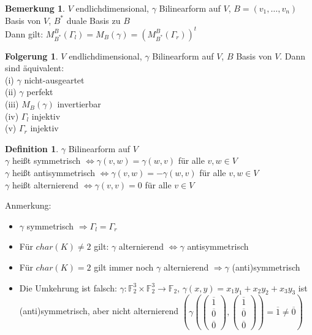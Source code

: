 \documentclass[10pt,a4paper,numbers=endperiod]{scrartcl}
\theoremstyle{definition}
\newtheorem{defi}[satz]{Definition}
\newtheorem{bem}[satz]{Bemerkung}
\newtheorem{folg}[satz]{Folgerung}
\def\FF{{\mathbb F}}
\begin{document}
\begin{bem}
	$V$ endlichdimensional, $\gamma$ Bilinearform auf $V$, $B = (v_1, \ldots, v_n)$ Basis von $V$, $B^*$ duale Basis zu $B$\\
	Dann gilt: $M_{B^*}^B (\varGamma_l) = M_B(\gamma) = (M_{B^*}^B (\varGamma_r))^t$
\end{bem}

\begin{folg}
	$V$ endlichdimensional, $\gamma$ Bilinearform auf $V$, $B$ Basis von $V$. Dann sind äquivalent:\\
	(i) $\gamma$ nicht-ausgeartet\\
	(ii) $\gamma$ perfekt\\
	(iii) $M_B (\gamma)$ invertierbar\\
	(iv) $\varGamma_l$ injektiv\\
	(v) $\varGamma_r$ injektiv
\end{folg}

\begin{defi}
	$\gamma$ Bilinearform auf $V$\\
	$\gamma$ heißt symmetrisch $\Leftrightarrow \gamma(v,w) = \gamma(w,v)$ für alle $v,w \in V$\\
	$\gamma$ heißt antisymmetrisch $\Leftrightarrow \gamma(v,w) = -\gamma(w,v)$ für alle $v,w \in V$\\
	$\gamma$ heißt alternierend $\Leftrightarrow \gamma(v,v) = 0$ für alle $v \in V$
\end{defi}

Anmerkung: \begin{itemize}
	\item $\gamma$ symmetrisch $\Rightarrow \varGamma_l = \varGamma_r$
	\item Für $char (K) \neq 2$ gilt: $\gamma$ alternierend $\Leftrightarrow \gamma$ antisymmetrisch
	\item Für $char (K) = 2$ gilt immer noch $\gamma$ alternierend $\Rightarrow \gamma$ (anti)symmetrisch
	\item Die Umkehrung ist falsch: $\gamma: \FF_2^3 \times \FF_2^3 \rightarrow \FF_2$, $\gamma(x,y) = x_1y_1+x_2y_2+x_3y_3$ ist (anti)symmetrisch, aber nicht alternierend $( \gamma(\begin{pmatrix}
	\overline{1}\\
	\overline{0}\\
	\overline{0}
	\end{pmatrix}, \begin{pmatrix}
	\overline{1}\\ \overline{0}\\ \overline{0}
	\end{pmatrix}) = \overline{1} \neq \overline{0})$
\end{itemize}
\end{document}
